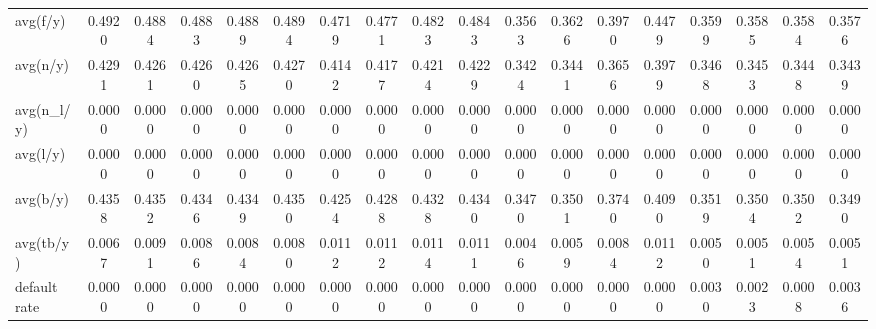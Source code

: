 \begin{table}[!htbp]
\begin{tabular}{lccccccccccccccccc}
avg(f/y) & 0.4920 & 0.4884 & 0.4883 & 0.4889 & 0.4894 & 0.4719 & 0.4771 & 0.4823 & 0.4843 & 0.3563 & 0.3626 & 0.3970 & 0.4479 & 0.3599 & 0.3585 & 0.3584 & 0.3576 \\
avg(n/y) & 0.4291 & 0.4261 & 0.4260 & 0.4265 & 0.4270 & 0.4142 & 0.4177 & 0.4214 & 0.4229 & 0.3424 & 0.3441 & 0.3656 & 0.3979 & 0.3468 & 0.3453 & 0.3448 & 0.3439 \\
avg(n_l/y) & 0.0000 & 0.0000 & 0.0000 & 0.0000 & 0.0000 & 0.0000 & 0.0000 & 0.0000 & 0.0000 & 0.0000 & 0.0000 & 0.0000 & 0.0000 & 0.0000 & 0.0000 & 0.0000 & 0.0000 \\
avg(l/y) & 0.0000 & 0.0000 & 0.0000 & 0.0000 & 0.0000 & 0.0000 & 0.0000 & 0.0000 & 0.0000 & 0.0000 & 0.0000 & 0.0000 & 0.0000 & 0.0000 & 0.0000 & 0.0000 & 0.0000 \\
avg(b/y) & 0.4358 & 0.4352 & 0.4346 & 0.4349 & 0.4350 & 0.4254 & 0.4288 & 0.4328 & 0.4340 & 0.3470 & 0.3501 & 0.3740 & 0.4090 & 0.3519 & 0.3504 & 0.3502 & 0.3490 \\
avg(tb/y) & 0.0067 & 0.0091 & 0.0086 & 0.0084 & 0.0080 & 0.0112 & 0.0112 & 0.0114 & 0.0111 & 0.0046 & 0.0059 & 0.0084 & 0.0112 & 0.0050 & 0.0051 & 0.0054 & 0.0051 \\
default rate & 0.0000 & 0.0000 & 0.0000 & 0.0000 & 0.0000 & 0.0000 & 0.0000 & 0.0000 & 0.0000 & 0.0000 & 0.0000 & 0.0000 & 0.0000 & 0.0030 & 0.0023 & 0.0008 & 0.0036 \\
\bottomrule
\end{tabular}
\end{table}
